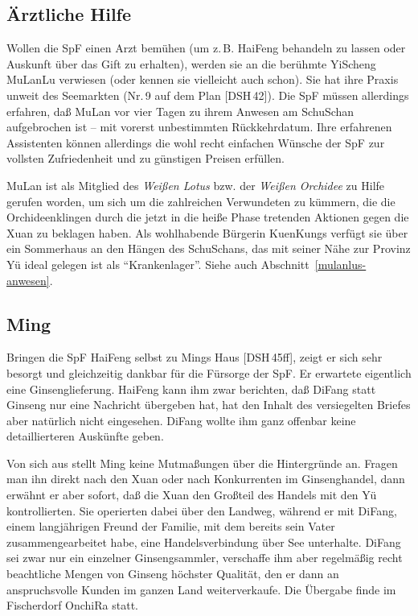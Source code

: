 \documentclass[
a4paper,
twoside,
DIV=calc,
BCOR=4mm,
fontsize=9pt,
twocolumn=on,
titlepage=on,
parskip=half
]{scrartcl}
\begin{document}
\subsection{Ärztliche Hilfe}

Wollen die SpF einen Arzt bemühen (um z.\,B. HaiFeng behandeln zu
lassen oder Auskunft über das Gift zu erhalten), werden sie an die
berühmte YiScheng MuLanLu verwiesen (oder kennen sie vielleicht auch
schon). Sie hat ihre Praxis unweit des Seemarkten (Nr.\,9 auf dem Plan
[DSH\,42]). Die SpF müssen allerdings erfahren, daß MuLan vor vier
Tagen zu ihrem Anwesen am SchuSchan aufgebrochen ist -- mit vorerst
unbestimmten Rückkehrdatum. Ihre erfahrenen Assistenten können
allerdings die wohl recht einfachen Wünsche der SpF zur vollsten
Zufriedenheit und zu günstigen Preisen erfüllen.

MuLan ist als Mitglied des \emph{Weißen Lotus} bzw. der \emph{Weißen
  Orchidee} zu Hilfe gerufen worden, um sich um die zahlreichen
Verwundeten zu kümmern, die die Orchideenklingen durch die jetzt in
die heiße Phase tretenden Aktionen gegen die Xuan zu beklagen
haben. Als wohlhabende Bürgerin KuenKungs verfügt sie über ein
Sommerhaus an den Hängen des SchuSchans, das mit seiner Nähe zur
Provinz Yü ideal gelegen ist als "`Krankenlager"'. Siehe auch
Abschnitt~\ref{mulanlus-anwesen}.

\subsection{Ming}

Bringen die SpF HaiFeng selbst zu Mings Haus [DSH\,45ff], zeigt er
sich sehr besorgt und gleichzeitig dankbar für die Fürsorge der
SpF. Er erwartete eigentlich eine Ginsenglieferung. HaiFeng kann ihm
zwar berichten, daß DiFang statt Ginseng nur eine Nachricht übergeben
hat, hat den Inhalt des versiegelten Briefes aber natürlich nicht
eingesehen. DiFang wollte ihm ganz offenbar keine detaillierteren
Auskünfte geben.

Von sich aus stellt Ming keine Mutmaßungen über die Hintergründe
an. Fragen man ihn direkt nach den Xuan oder nach Konkurrenten im
Ginsenghandel, dann erwähnt er aber sofort, daß die Xuan den Großteil
des Handels mit den Yü kontrollierten. Sie operierten dabei über den
Landweg, während er mit DiFang, einem langjährigen Freund der Familie,
mit dem bereits sein Vater zusammengearbeitet habe, eine
Handelsverbindung über See unterhalte. DiFang sei zwar nur ein
einzelner Ginsengsammler, verschaffe ihm aber regelmäßig recht
beachtliche Mengen von Ginseng höchster Qualität, den er dann an
anspruchsvolle Kunden im ganzen Land weiterverkaufe. Die Übergabe
finde im Fischerdorf OnchiRa statt.
\end{document}
